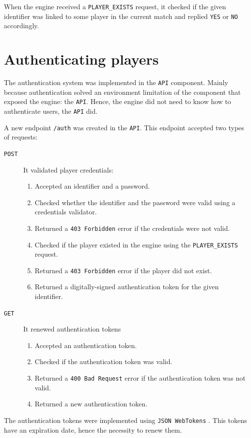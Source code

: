 \documentclass[a4paper,11pt,titlepage,abstract,numbers=noenddot,automark,mnsy,intlimits,rgb,dvipsnames]{report}
\begin{document}
When the engine received a \texttt{PLAYER\_EXISTS} request, it checked if the given identifier was linked to some player in
the current match and replied \texttt{YES} or \texttt{NO} accordingly.
\section{Authenticating players}
The authentication system was implemented in the \texttt{API} component. Mainly because authentication solved an environment
limitation of the component that exposed the engine: the \texttt{API}. Hence, the engine did not need to know how to authenticate
users, the \texttt{API} did.

A new endpoint \texttt{/auth} was created in the \texttt{API}. This endpoint accepted two types of requests:
\begin{description}
\item[\texttt{POST}]
It validated player credentials:
\begin{enumerate}
\item
Accepted an identifier and a password.
\item
Checked whether the identifier and the password were valid using a credentials validator.
\item
Returned a \texttt{403 Forbidden} error if the credentials were not valid.
\item
Checked if the player existed in the engine using the \texttt{PLAYER\_EXISTS} request.
\item
Returned a \texttt{403 Forbidden} error if the player did not exist.
\item
Returned a digitally-signed authentication token for the given identifier.
\end{enumerate}
\item[\texttt{GET}]
It renewed authentication tokens
\begin{enumerate}
\item
Accepted an authentication token.
\item
Checked if the authentication token was valid.
\item
Returned a \texttt{400 Bad Request} error if the authentication token was not valid.
\item
Returned a new authentication token.
\end{enumerate}
\end{description}
The authentication tokens were implemented using \texttt{JSON WebTokens} \cite{jwt}. This tokens have an expìration date,
hence the necessity to renew them.
\end{document}
